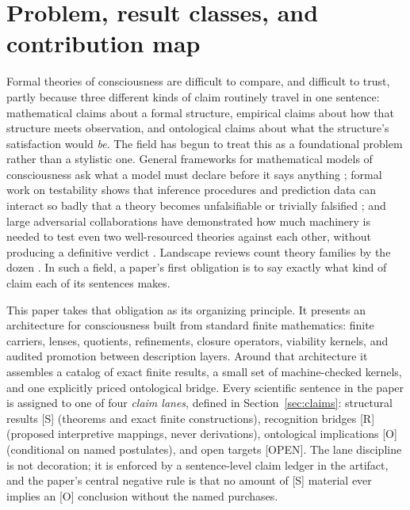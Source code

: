 \documentclass[11pt]{article}
\newcommand{\gradeS}{\textsf{[S]}}
\newcommand{\gradeR}{\textsf{[R]}}
\newcommand{\gradeO}{\textsf{[O]}}
\newcommand{\gradeOpen}{\textsf{[OPEN]}}
\theoremstyle{definition}
\begin{document}
\section{Problem, result classes, and contribution map}
\label{sec:intro}


Formal theories of consciousness are difficult to compare, and difficult to
trust, partly because three different kinds of claim routinely travel in one
sentence: mathematical claims about a formal structure, empirical claims about
how that structure meets observation, and ontological claims about what the
structure's satisfaction would \emph{be}. The field has begun to treat this as
a foundational problem rather than a stylistic one. General frameworks for
mathematical models of consciousness ask what a model must declare before it
says anything \citep{Kleiner2020MathematicalModels, KleinerTull2021}; formal
work on testability shows that inference procedures and prediction data can
interact so badly that a theory becomes unfalsifiable or trivially falsified
\citep{KleinerHoel2021, DoerigEtAl2020HardCriteria}; and large adversarial
collaborations have demonstrated how much machinery is needed to test even two
well-resourced theories against each other, without producing a definitive
verdict \citep{CogitateConsortium2025}. Landscape reviews count theory families
by the dozen \citep{SethBayne2022}. In such a field, a paper's first obligation
is to say exactly what kind of claim each of its sentences makes.

This paper takes that obligation as its organizing principle. It presents an
architecture for consciousness built from standard finite mathematics:
finite carriers, lenses, quotients, refinements, closure operators, viability
kernels, and audited promotion between description layers. Around that
architecture it assembles a catalog of exact finite results, a small set of
machine-checked kernels, and one explicitly priced ontological bridge. Every
scientific sentence in the paper is assigned to one of four \emph{claim lanes},
defined in Section~\ref{sec:claims}: structural results \gradeS{} (theorems and
exact finite constructions), recognition bridges \gradeR{} (proposed
interpretive mappings, never derivations), ontological implications \gradeO{}
(conditional on named postulates), and open targets \gradeOpen. The lane
discipline is not decoration; it is enforced by a sentence-level claim ledger
in the artifact, and the paper's central negative rule is that no amount of
\gradeS{} material ever implies an \gradeO{} conclusion without the named
purchases.
\end{document}
